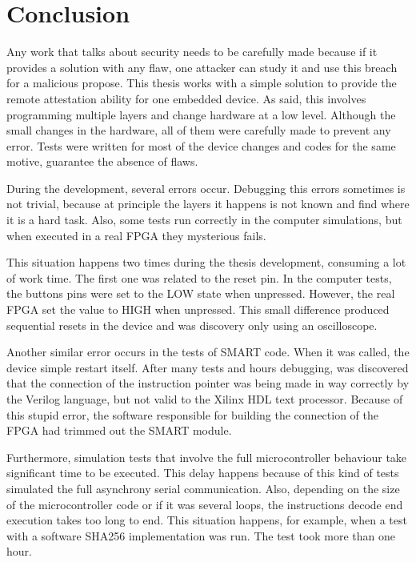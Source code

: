 \chapter{Conclusion}
\label{cap:conclusoes}


Any work that talks about security needs to be carefully made because if it provides a solution with any flaw, one attacker can study it and use this breach for a malicious propose. This thesis works with a simple solution to provide the remote attestation ability for one embedded device. As said, this involves programming multiple layers and change hardware at a low level. Although the small changes in the hardware, all of them were carefully made to prevent any error. Tests were written for most of the device changes and codes for the same motive, guarantee the absence of flaws. 

During the development, several errors occur. Debugging this errors sometimes is not trivial, because at principle the layers it happens is not known and find where it is a hard task. Also, some tests run correctly in the computer simulations, but when executed in a real FPGA they mysterious fails. 

This situation happens two times during the thesis development, consuming a lot of work time. The first one was related to the reset pin. In the computer tests, the buttons pins were set to the LOW state when unpressed. However, the real FPGA set the value to HIGH when unpressed. This small difference produced sequential resets in the device and was discovery only using an oscilloscope. 

Another similar error occurs in the tests of SMART code. When it was called, the device simple restart itself. After many tests and hours debugging, was discovered that the connection of the instruction pointer was being made in way correctly by the Verilog language, but not valid to the Xilinx HDL text processor. Because of this stupid error, the software responsible for building the connection of the FPGA had trimmed out the SMART module.

Furthermore, simulation tests that involve the full microcontroller behaviour take significant time to be executed. This delay happens because of this kind of tests simulated the full asynchrony serial communication. Also, depending on the size of the microcontroller code or if it was several loops, the instructions decode end execution takes too long to end. This situation happens, for example, when a test with a software SHA256 implementation was run. The test took more than one hour.

